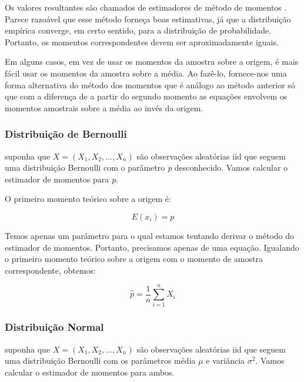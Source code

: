Os valores resultantes são chamados de estimadores de método de momentos . Parece razoável que esse método forneça boas estimativas, já que a distribuição empírica converge, em certo sentido, para a distribuição de probabilidade. Portanto, os momentos correspondentes devem ser aproximadamente iguais.

Em alguns casos, em vez de usar os momentos da amostra sobre a origem, é mais fácil usar os momentos da amostra sobre a média. Ao fazê-lo, fornece-nos uma forma alternativa do método dos momentos que é análogo ao método anterior só que com a diferença de a partir do segundo momento as equações envolvem os momentos amostrais sobre a média ao invés da origem.



\subsubsection{Distribuição de Bernoulli}

suponha que \begin{math} X = (X_1, X_2, ..., X_n) \end{math} são observações aleatórias iid que seguem uma distribuição Bernoulli com o parâmetro \emph{p} desconhecido. Vamos calcular o estimador de momentos para \emph{p}.

O primeiro momento teórico sobre a origem é:

\begin{equation}
	E(x_i) = p
\end{equation}

Temos apenas um parâmetro para o qual estamos tentando derivar o método do estimador de momentos. Portanto, precisamos apenas de uma equação. Igualando o primeiro momento teórico sobre a origem com o momento de amostra correspondente, obtemos:

\begin{equation}
	\hat{p}=\dfrac{1}{n}\sum\limits_{i=1}^n X_i
\end{equation}

\subsubsection{Distribuição Normal}

suponha que \begin{math} X = (X_1, X_2, ..., X_n) \end{math} são observações aleatórias iid que seguem uma distribuição Bernoulli com os parâmetros média \begin{math} \mu \end{math} e variância \begin{math} \sigma^2 \end{math}. Vamos calcular o estimador de momentos para ambos.


